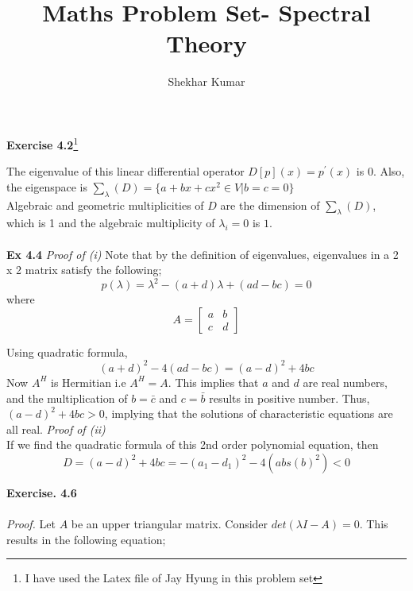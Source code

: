 \documentclass[letterpaper,12pt]{article}
\title{Maths Problem Set- Spectral Theory}
\author{Shekhar Kumar}
\theoremstyle{definition}
\begin{document}
  \maketitle {}
  \author{}
  \date{}

\textbf{Exercise 4.2}\footnote{I have used the Latex file of Jay Hyung in this problem set}

The eigenvalue of this linear differential operator $D[p](x) = p^{'} (x)$ is $0$. Also, the eigenspace is $ \sum_{\lambda}(D) = \{a + bx + c x^2 \in V | b=c=0\}$ \\
Algebraic and geometric multiplicities of $D$ are the dimension of $ \sum_{\lambda}(D)$, which is 1 and the algebraic multiplicity of $\lambda_i = 0$ is $1$. \\\\
\textbf{Ex 4.4}
\emph{Proof of (i) }
Note that by the definition of eigenvalues, eigenvalues in a 2 x 2 matrix satisfy the following;
\[p(\lambda)  = \lambda^2 - (a+d) \lambda + (ad - bc) = 0\]
where
\[A= \begin{bmatrix}
  a & b \\
  c & d
\end{bmatrix}\]

Using quadratic formula,
\[(a+d)^2 - 4(ad - bc) = (a-d)^2 + 4bc \]
Now $A^H$ is Hermitian i.e $A^H = A$. This implies that $a$ and $d$ are real numbers, and the multiplication of $b=\bar{c}$ and $c=\bar{b}$ results in positive number. Thus, $(a-d)^2 + 4bc >0$, implying that the solutions of characteristic equations are all real.
\newline
\emph{Proof of (ii)} \\
If we find the quadratic formula of this 2nd order polynomial equation, then
\[D = (a-d)^2 + 4bc = -(a_1 - d_1)^2 - 4(abs(b)^2) < 0 \]
\newline


\textbf{Exercise. 4.6} \\\\
\emph{Proof.} Let $A$ be an upper triangular matrix. Consider $det(\lambda I - A) = 0 $. This results in the following equation;
\end{document}
